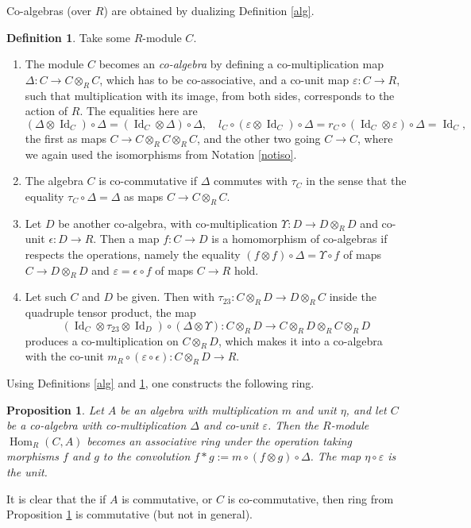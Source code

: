 \documentclass{article}
\newtheorem{prop}[thm]{Proposition}
\theoremstyle{definition}
\newtheorem{defn}[thm]{Definition}
\begin{document}
Co-algebras (over $R$) are obtained by dualizing Definition \ref{alg}.
\begin{defn}
Take some $R$-module $C$.
\begin{enumerate}[$(i)$]
\item The module $C$ becomes an \emph{co-algebra} by defining a co-multiplication map $\Delta:C \to C\otimes_{R}C$, which has to be co-associative, and a co-unit map $\varepsilon:C \to R$, such that multiplication with its image, from both sides, corresponds to the action of $R$. The equalities here are \[(\Delta\otimes\operatorname{Id}_{C})\circ\Delta=(\operatorname{Id}_{C}\otimes\Delta)\circ\Delta,\quad l_{C}\circ(\varepsilon\otimes\operatorname{Id}_{C})\circ\Delta=r_{C}\circ(\operatorname{Id}_{C}\otimes\varepsilon)\circ\Delta=\operatorname{Id}_{C},\] the first as maps $C \to C\otimes_{R}C\otimes_{R}C$, and the other two going $C \to C$, where we again used the isomorphisms from Notation \ref{notiso}.
\item The algebra $C$ is co-commutative if $\Delta$ commutes with $\tau_{C}$ in the sense that the equality $\tau_{C}\circ\Delta=\Delta$ as maps $C \to C\otimes_{R}C$.
\item Let $D$ be another co-algebra, with co-multiplication $\Upsilon:D \to D\otimes_{R}D$ and co-unit $\epsilon:D \to R$. Then a map $f:C \to D$ is a homomorphism of co-algebras if respects the operations, namely the equality $(f \otimes f)\circ\Delta=\Upsilon \circ f$ of maps $C \to D\otimes_{R}D$ and $\varepsilon=\epsilon \circ f$ of maps $C \to R$ hold.
\item Let such $C$ and $D$ be given. Then with $\tau_{23}:C\otimes_{R}D \to D\otimes_{R}C$ inside the quadruple tensor product, the map \[(\operatorname{Id}_{C}\otimes\tau_{23}\otimes\operatorname{Id}_{D})\circ(\Delta\otimes\Upsilon):C\otimes_{R}D \to C\otimes_{R}D\otimes_{R}C\otimes_{R}D\] produces a co-multiplication on $C\otimes_{R}D$, which makes it into a co-algebra with the co-unit $m_{R}\circ(\varepsilon\circ\epsilon):C\otimes_{R}D \to R$.
\end{enumerate} \label{coalg}
\end{defn}
Using Definitions \ref{alg} and \ref{coalg}, one constructs the following ring.
\begin{prop}
Let $A$ be an algebra with multiplication $m$ and unit $\eta$, and let $C$ be a co-algebra with co-multiplication $\Delta$ and co-unit $\varepsilon$. Then the $R$-module $\operatorname{Hom}_{R}(C,A)$ becomes an associative ring under the operation taking morphisms $f$ and $g$ to the \emph{convolution} $f*g:=m\circ(f \otimes g)\circ\Delta$. The map $\eta\circ\varepsilon$ is the unit. \label{conv}
\end{prop}
It is clear that the if $A$ is commutative, or $C$ is co-commutative, then ring from Proposition \ref{conv} is commutative (but not in general).
\end{document}
